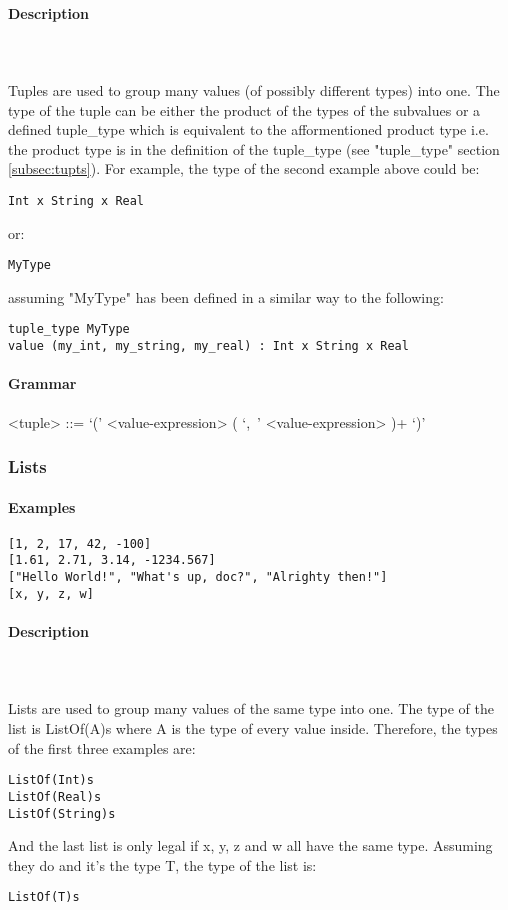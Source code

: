 \documentclass{article}
\def\pend{\mbox{} \\\\}
\begin{document}
\paragraph{Description}\pend
Tuples are used to group many values (of possibly different types) into one.
The type of the tuple can be either the product of the types of the subvalues or a
defined tuple\_type which is equivalent to the afformentioned product type i.e.
the product type is in the definition of the tuple\_type (see "tuple\_type"
section \ref{subsec:tupts}). For example, the type of the second example above 
could be:
\begin{verbatim}
Int x String x Real
\end{verbatim}
or:
\begin{verbatim}
MyType
\end{verbatim}
assuming "MyType" has been defined in a similar way to the following:
\begin{verbatim}
tuple_type MyType
value (my_int, my_string, my_real) : Int x String x Real
\end{verbatim}


\paragraph{Grammar}
\begin{grammar}
<tuple> ::= `(' <value-expression> ( `,\ ' <value-expression> )+ `)'
\end{grammar}

\subsubsection{Lists}

\paragraph{Examples}

\begin{verbatim}
[1, 2, 17, 42, -100]
[1.61, 2.71, 3.14, -1234.567]
["Hello World!", "What's up, doc?", "Alrighty then!"]
[x, y, z, w]
\end{verbatim}

\paragraph{Description}\pend
Lists are used to group many values of the same type into one. 
The type of the list is ListOf(A)s where A is the type of every value inside.
Therefore, the types of the first three examples are:
\begin{verbatim}
ListOf(Int)s
ListOf(Real)s
ListOf(String)s
\end{verbatim}
And the last list is only legal if x, y, z and w all have the same type. Assuming 
they do and it's the type T, the type of the list is: 
\begin{verbatim}
ListOf(T)s
\end{verbatim}
\end{document}
